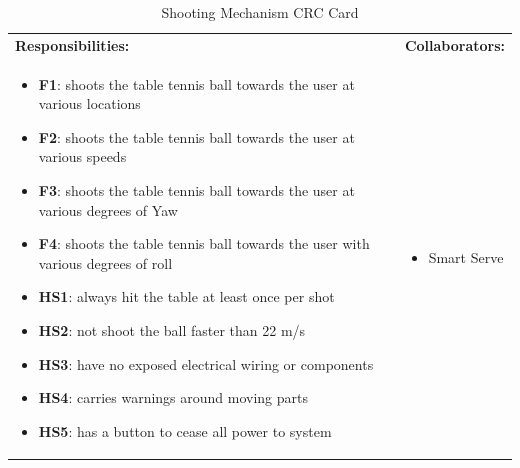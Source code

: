 \documentclass[11pt]{article}
\begin{document}
\begin{table}[H]
\centering
\label{my-label}
\begin{tabular}{ | >{\raggedright\arraybackslash}p{} | >{\raggedright\arraybackslash}p{} | }
\hline
\multicolumn{2}{|c|}{\textbf{Smart Serve}}             \\ \hline
\textbf{Responsibilities:} & \textbf{Collaborators:} \\ \hline
\begin{itemize}
\item \textbf{F1}: shoots the table tennis ball towards the user at various locations
\item \textbf{F2}: shoots the table tennis ball towards the user at various speeds
\item \textbf{F3}: shoots the table tennis ball towards the user at various degrees of Yaw
\item \textbf{F4}: shoots the table tennis ball towards the user with various degrees of roll
\item \textbf{HS1}: always hit the table at least once per shot
\item \textbf{HS2}: not shoot the ball faster than 22 m/s
\item \textbf{HS3}: have no exposed electrical wiring or components
\item \textbf{HS4}: carries warnings around moving parts
\item \textbf{HS5}: has a button to cease all power to system
\end{itemize}
&
\begin{itemize}
\item Smart Serve
\end{itemize} \\ \hline
\end{tabular}
\caption{Shooting Mechanism CRC Card}
\end{table}
\end{document}
